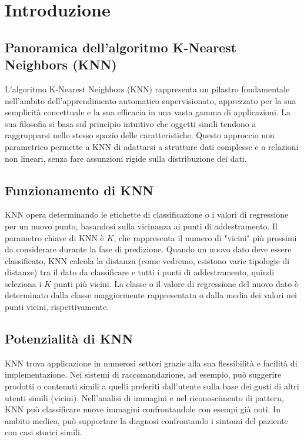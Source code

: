
\section{Introduzione}

\subsection{Panoramica dell'algoritmo K-Nearest Neighbors (KNN)}
L'algoritmo K-Nearest Neighbors (KNN) rappresenta un pilastro fondamentale 
nell'ambito dell'apprendimento automatico supervisionato, apprezzato per la 
sua semplicità concettuale e la sua efficacia in una vasta gamma di applicazioni. 
La sua filosofia si basa sul principio intuitivo che oggetti simili tendono a 
raggrupparsi nello stesso spazio delle caratteristiche. Questo approccio non 
parametrico permette a KNN di adattarsi a strutture dati complesse e 
a relazioni non lineari, senza fare assunzioni rigide sulla distribuzione dei dati.

\subsection{Funzionamento di KNN}

KNN opera determinando le etichette di classificazione o i valori di 
regressione per un nuovo punto, basandosi sulla vicinanza ai punti di addestramento. 
Il parametro chiave di KNN è $K$, che rappresenta il numero di "vicini" più prossimi 
da considerare durante la fase di predizione. Quando un nuovo dato deve essere 
classificato, KNN calcola la distanza (come vedremo, esistono varie tipologie di distanze) 
tra il dato da classificare 
e tutti i punti di addestramento, quindi seleziona i $K$ punti più vicini. La classe o 
il valore di regressione del nuovo dato è determinato dalla classe maggiormente rappresentata
o dalla media dei valori nei punti vicini, rispettivamente.

\subsection{Potenzialità di KNN}

KNN trova applicazione in numerosi settori grazie alla sua flessibilità e facilità di 
implementazione. Nei sistemi di raccomandazione, ad esempio, può suggerire prodotti o 
contenuti simili a quelli preferiti dall'utente sulla base dei gusti di altri utenti simili 
(vicini). Nell'analisi di immagini e nel riconoscimento di pattern, KNN può classificare 
nuove immagini confrontandole con esempi già noti. In ambito medico, può supportare la diagnosi 
confrontando i sintomi del paziente con casi storici simili.

